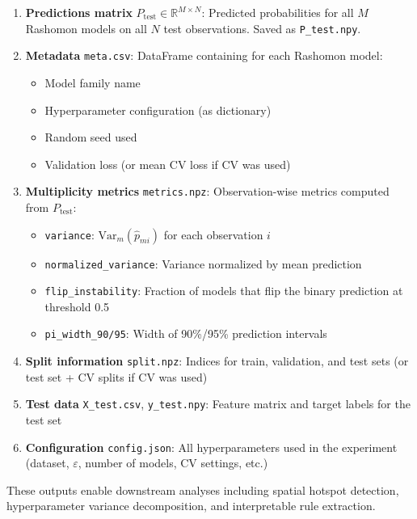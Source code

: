 \begin{enumerate}
    \item \textbf{Predictions matrix} $P_{\text{test}} \in \mathbb{R}^{M \times N}$: Predicted probabilities for all $M$ Rashomon models on all $N$ test observations. Saved as \texttt{P\_test.npy}.
    
    \item \textbf{Metadata} \texttt{meta.csv}: DataFrame containing for each Rashomon model:
    \begin{itemize}
        \item Model family name
        \item Hyperparameter configuration (as dictionary)
        \item Random seed used
        \item Validation loss (or mean CV loss if CV was used)
    \end{itemize}
    
    \item \textbf{Multiplicity metrics} \texttt{metrics.npz}: Observation-wise metrics computed from $P_{\text{test}}$:
    \begin{itemize}
        \item \texttt{variance}: $\text{Var}_m(\hat{p}_{mi})$ for each observation $i$
        \item \texttt{normalized\_variance}: Variance normalized by mean prediction
        \item \texttt{flip\_instability}: Fraction of models that flip the binary prediction at threshold 0.5
        \item \texttt{pi\_width\_90/95}: Width of 90\%/95\% prediction intervals
    \end{itemize}
    
    \item \textbf{Split information} \texttt{split.npz}: Indices for train, validation, and test sets (or test set + CV splits if CV was used)
    
    \item \textbf{Test data} \texttt{X\_test.csv}, \texttt{y\_test.npy}: Feature matrix and target labels for the test set
    
    \item \textbf{Configuration} \texttt{config.json}: All hyperparameters used in the experiment (dataset, $\varepsilon$, number of models, CV settings, etc.)
\end{enumerate}

These outputs enable downstream analyses including spatial hotspot detection, hyperparameter variance decomposition, and interpretable rule extraction.
